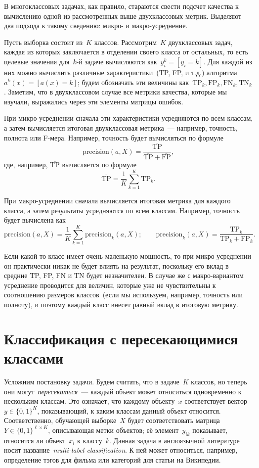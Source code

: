 \documentclass[12pt,fleqn]{article}
\begin{document}
В многоклассовых задачах, как правило, стараются свести подсчет качества
к вычислению одной из рассмотренных выше двухклассовых метрик.
Выделяют два подхода к такому сведению: микро- и макро-усреднение.

Пусть выборка состоит из~$K$ классов.
Рассмотрим~$K$ двухклассовых задач, каждая из которых заключается
в отделении своего класса от остальных, то есть целевые значения
для~$k$-й задаче вычисляются как~$y_i^k = [y_i = k]$.
Для каждой из них можно вычислить различные характеристики~(TP, FP, и т.д.)
алгоритма~$a^k(x) = [a(x) = k]$;
будем обозначать эти величины как~$\text{TP}_k, \text{FP}_k, \text{FN}_k, \text{TN}_k$.
Заметим, что в двухклассовом случае все метрики качества, которые мы изучали,
выражались через эти элементы матрицы ошибок.

При микро-усреднении сначала эти характеристики усредняются по всем классам,
а затем вычисляется итоговая двухклассовая метрика~--- например, точность, полнота или F-мера.
Например, точность будет вычисляться по формуле
\[
    \text{precision}(a, X)
    =
    \frac{
        \overline{\text{TP}}
    }{
        \overline{\text{TP}}
        +
        \overline{\text{FP}}
    },
\]
где, например, $\overline{\text{TP}}$ вычисляется по формуле
\[
    \overline{\text{TP}}
    =
    \frac{1}{K}
    \sum_{k = 1}^{K}
        \text{TP}_k.
\]

При макро-усреднении сначала вычисляется итоговая метрика для каждого класса, а затем результаты
усредняются по всем классам.
Например, точность будет вычислена как
\[
    \text{precision}(a, X)
    =
    \frac{1}{K}
    \sum_{k = 1}^{K}
        \text{precision}_k(a, X);
    \qquad
    \text{precision}_k(a, X)
    =
    \frac{
        \text{TP}_k
    }{
        \text{TP}_k
        +
        \text{FP}_k
    }.
\]

Если какой-то класс имеет очень маленькую мощность, то при микро-усреднении он практически никак не будет
влиять на результат, поскольку его вклад в средние TP, FP, FN и TN будет незначителен.
В случае же с макро-вариантом усреднение проводится для величин,
которые уже не чувствительны к соотношению размеров классов~(если мы используем, например, точность или полноту), и поэтому
каждый класс внесет равный вклад в итоговую метрику.

\section{Классификация с пересекающимися классами}

Усложним постановку задачи.
Будем считать, что в задаче~$K$ классов, но теперь они могут~\emph{пересекаться}~---
каждый объект может относиться одновременно к нескольким классам.
Это означает, что каждому объекту~$x$ соответствует вектор~$y \in \{0, 1\}^K$,
показывающий, к каким классам данный объект относится.
Соответственно, обучающей выборке~$X$ будет соответствовать матрица~$Y \in \{0, 1\}^{\ell \times K}$,
описывающая метки объектов;
её элемент~$y_{ik}$ показывает, относится ли объект~$x_i$ к классу~$k$.
Данная задача в англоязычной литературе носит название~\emph{multi-label classification}.
К ней может относиться, например, определение тэгов для фильма
или категорий для статьи на Википедии.
\end{document}
